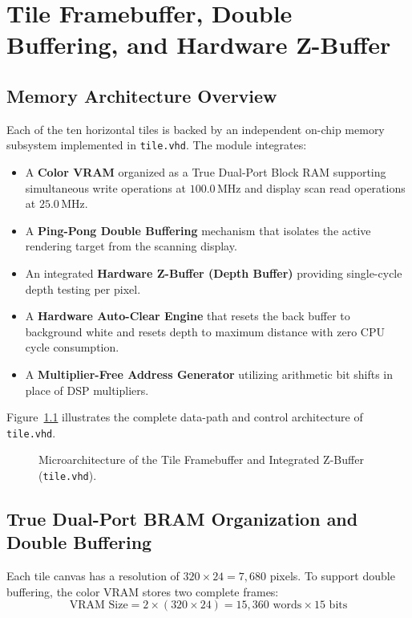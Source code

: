 \chapter{Tile Framebuffer, Double Buffering, and Hardware Z-Buffer}
\label{chap:tile_memory}

\section{Memory Architecture Overview}
Each of the ten horizontal tiles is backed by an independent on-chip memory subsystem implemented in \texttt{tile.vhd}. The module integrates:
\begin{itemize}
    \item A \textbf{Color VRAM} organized as a True Dual-Port Block RAM supporting simultaneous write operations at $100.0\,\text{MHz}$ and display scan read operations at $25.0\,\text{MHz}$.
    \item A \textbf{Ping-Pong Double Buffering} mechanism that isolates the active rendering target from the scanning display.
    \item An integrated \textbf{Hardware Z-Buffer (Depth Buffer)} providing single-cycle depth testing per pixel.
    \item A \textbf{Hardware Auto-Clear Engine} that resets the back buffer to background white and resets depth to maximum distance with zero CPU cycle consumption.
    \item A \textbf{Multiplier-Free Address Generator} utilizing arithmetic bit shifts in place of DSP multipliers.
\end{itemize}

Figure~\ref{fig:tile_memory} illustrates the complete data-path and control architecture of \texttt{tile.vhd}.

\begin{figure}[htbp]
\centering
\resizebox{0.95\textwidth}{!}{
    
}
\caption{Microarchitecture of the Tile Framebuffer and Integrated Z-Buffer (\texttt{tile.vhd}).}
\label{fig:tile_memory}
\end{figure}

\section{True Dual-Port BRAM Organization and Double Buffering}
Each tile canvas has a resolution of $320 \times 24 = 7{,}680$ pixels. To support double buffering, the color VRAM stores two complete frames:
\begin{equation}
\text{VRAM Size} = 2 \times (320 \times 24) = 15{,}360 \text{ words} \times 15 \text{ bits}
\end{equation}


